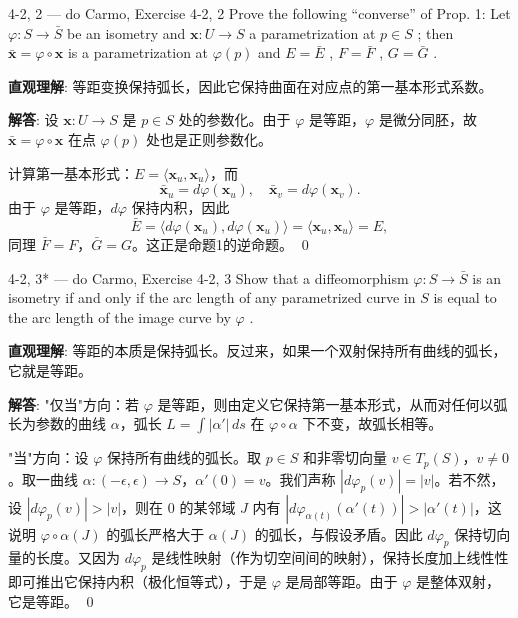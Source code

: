 \begin{exercise}{4-2, 2 — do Carmo, Exercise 4-2, 2}
Prove the following ``converse'' of Prop. 1: Let $\varphi \colon S \to \bar{S}$ be an isometry and $\mathbf{x}\colon U \to S$ a parametrization at $p \in S$ ; then $\bar{\mathbf{x}} = \varphi \circ \mathbf{x}$ is a parametrization at $\varphi(p)$ and $E = \bar{E}$ , $F = \bar{F}$ , $G = \bar{G}$ .
\end{exercise}

\begin{solution}
\textbf{直观理解}: 等距变换保持弧长，因此它保持曲面在对应点的第一基本形式系数。

\textbf{解答}: 设 $\mathbf{x}: U \to S$ 是 $p\in S$ 处的参数化。由于 $\varphi$ 是等距，$\varphi$ 是微分同胚，故 $\bar{\mathbf{x}} = \varphi \circ \mathbf{x}$ 在点 $\varphi(p)$ 处也是正则参数化。

计算第一基本形式：$E = \langle \mathbf{x}_u,\mathbf{x}_u\rangle$，而
\[
\bar{\mathbf{x}}_u = d\varphi(\mathbf{x}_u),\quad \bar{\mathbf{x}}_v = d\varphi(\mathbf{x}_v).
\]
由于 $\varphi$ 是等距，$d\varphi$ 保持内积，因此
\[
\bar{E} = \langle d\varphi(\mathbf{x}_u),d\varphi(\mathbf{x}_u)\rangle = \langle \mathbf{x}_u,\mathbf{x}_u\rangle = E,
\]
同理 $\bar{F} = F$，$\bar{G} = G$。这正是命题1的逆命题。
\qed
\end{solution}

\begin{exercise}{4-2, 3* — do Carmo, Exercise 4-2, 3}
Show that a diffeomorphism $\varphi \colon S \to \bar{S}$ is an isometry if and only if the arc length of any parametrized curve in $S$ is equal to the arc length of the image curve by $\varphi$ .
\end{exercise}

\begin{solution}
\textbf{直观理解}: 等距的本质是保持弧长。反过来，如果一个双射保持所有曲线的弧长，它就是等距。

\textbf{解答}: "仅当"方向：若 $\varphi$ 是等距，则由定义它保持第一基本形式，从而对任何以弧长为参数的曲线 $\alpha$，弧长 $L = \int |\alpha'|\,ds$ 在 $\varphi\circ\alpha$ 下不变，故弧长相等。

"当"方向：设 $\varphi$ 保持所有曲线的弧长。取 $p\in S$ 和非零切向量 $v\in T_p(S)$，$v\neq 0$。取一曲线 $\alpha:(-\epsilon,\epsilon)\to S$，$\alpha'(0)=v$。我们声称 $|d\varphi_p(v)| = |v|$。若不然，设 $|d\varphi_p(v)| > |v|$，则在 $0$ 的某邻域 $J$ 内有 $|d\varphi_{\alpha(t)}(\alpha'(t))| > |\alpha'(t)|$，这说明 $\varphi\circ\alpha(J)$ 的弧长严格大于 $\alpha(J)$ 的弧长，与假设矛盾。因此 $d\varphi_p$ 保持切向量的长度。又因为 $d\varphi_p$ 是线性映射（作为切空间间的映射），保持长度加上线性性即可推出它保持内积（极化恒等式），于是 $\varphi$ 是局部等距。由于 $\varphi$ 是整体双射，它是等距。
\qed
\end{solution}

